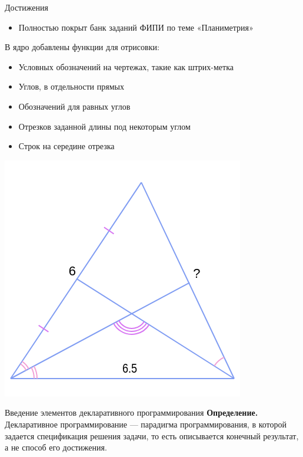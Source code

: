\documentclass[aspectratio=169,12pt]{beamer}
\begin{document}
\begin{frame}{Достижения}
	\begin{multicols}{2}
		\begin{itemize}
			\item Полностью покрыт банк заданий ФИПИ по теме «Планиметрия»
		\end{itemize}
		В ядро добавлены функции для отрисовки:
		\begin{itemize}
			\item Условных обозначений на чертежах, такие как штрих-метка
			\item Углов, в отдельности прямых
			\item Обозначений для равных углов
			\item Отрезков заданной длины под некоторым углом
			\item Строк на середине отрезка
		\end{itemize}
		\includegraphics[width=0.9\linewidth]{function_plan.png}
	\end{multicols}
\end{frame}

\begin{frame}{Введение элементов декларативного программирования}
	\textbf{Определение.} Декларативное программирование — парадигма программирования, в которой задается спецификация решения задачи, то есть описывается конечный результат, а не способ его достижения.
\end{frame}
\end{document}

